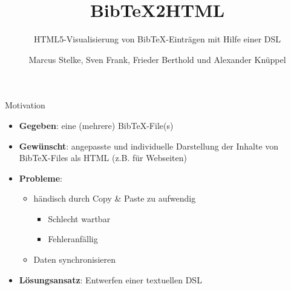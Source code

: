 \documentclass[fleqn,11pt,aspectratio=43]{beamer}
\title{BibTeX2HTML}
\subtitle{HTML5-Visualisierung von BibTeX-Einträgen mit Hilfe einer DSL}
\author{Marcus Stelke, Sven Frank, Frieder Berthold und Alexander Knüppel}
\begin{document}
\begin{frame}[plain]
\titlepage
\end{frame}

\begin{frame}{Motivation}
\begin{itemize}
\item \textbf{Gegeben}: eine (mehrere) BibTeX-File(s)
\item \textbf{Gewünscht}: angepasste und individuelle Darstellung der Inhalte von BibTeX-Files als HTML (z.B. für Webseiten)
\item \textbf{Probleme}: 
\begin{itemize}
\item händisch durch Copy \& Paste zu aufwendig
\begin{itemize}
\item Schlecht wartbar
\item Fehleranfällig
\end{itemize}
\item Daten synchronisieren
\end{itemize}
\item \textbf{Lösungsansatz}: Entwerfen einer textuellen DSL
\end{itemize}
\end{frame}
\end{document}
